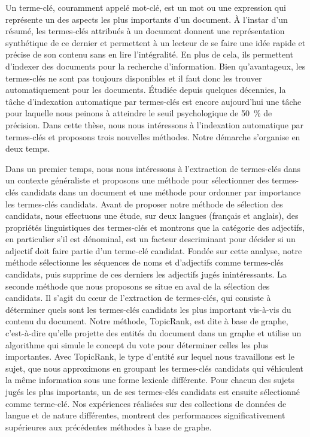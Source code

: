 Un terme-clé, couramment appelé mot-clé, est un mot ou une expression qui
représente un des aspects les plus importants d'un document. À l'instar d'un
résumé, les termes-clés attribués à un document donnent une représentation
synthétique de ce dernier et permettent à un lecteur de se faire une idée rapide
et précise de son contenu sans en lire l'intégralité. En plus de cela, ils
permettent d'indexer des documents pour la recherche d'information. Bien
qu'avantageux, les termes-clés ne sont pas toujours disponibles et il faut donc
les trouver automatiquement pour les documents. Étudiée depuis quelques
décennies, la tâche d'indexation automatique par termes-clés est encore
aujourd'hui une tâche pour laquelle nous peinons à atteindre le seuil
psychologique de 50~\% de précision. Dans cette thèse, nous nous intéressons à
l'indexation automatique par termes-clés et proposons trois nouvelles méthodes.
Notre démarche s'organise en deux temps.

Dans un premier temps, nous nous intéressons à l'extraction de termes-clés dans
un contexte généraliste et proposons une méthode pour sélectionner des
termes-clés candidats dans un document et une méthode pour ordonner par
importance les termes-clés candidats. Avant de proposer notre méthode de
sélection des candidats, nous effectuons une étude, sur deux langues (français
et anglais), des propriétés linguistiques des termes-clés et montrons que la
catégorie des adjectifs, en particulier s'il est dénominal, est un facteur
descriminant pour décider si un adjectif doit faire partie d'un terme-clé
candidat. Fondée sur cette analyse, notre méthode sélectionne les séquences de
noms et d'adjectifs comme termes-clés candidats, puis supprime de ces derniers
les adjectifs jugés inintéressants. La seconde méthode que nous proposons se
situe en aval de la sélection des candidats. Il s'agit du c\oe{}ur de
l'extraction de termes-clés, qui consiste à déterminer quels sont les
termes-clés candidats les plus important vis-à-vis du contenu du document. Notre
méthode, TopicRank, est dite \og{}à base de graphe\fg{}, c'est-à-dire qu'elle
projette des entités du document dans un graphe et utilise un algorithme qui
simule le concept du vote pour déterminer celles les plus importantes. Avec
TopicRank, le type d'entité sur lequel nous travaillons est le sujet, que nous
approximons en groupant les termes-clés candidats qui véhiculent la même
information sous une forme lexicale différente. Pour chacun des sujets jugés les
plus importants, un de ses termes-clés candidats est ensuite sélectionné comme
terme-clé. Nos expériences réalisées sur des collections de données de langue et
de nature différentes, montrent des performances significativement supérieures
aux précédentes méthodes \og{}à base de graphe\fg{}.

